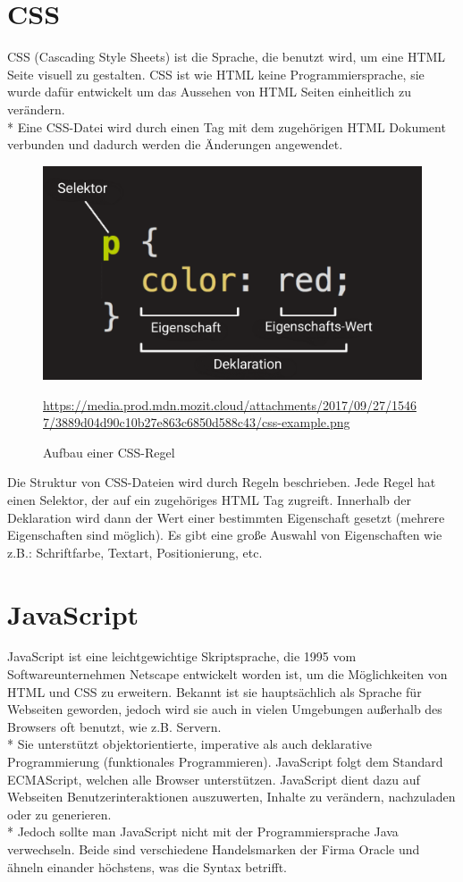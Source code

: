 \section{CSS}
\author{Benjamin Besic}
CSS (Cascading Style Sheets) ist die Sprache, die benutzt wird, um eine HTML Seite visuell zu gestalten. CSS ist wie HTML keine Programmiersprache, sie wurde dafür entwickelt um das Aussehen von HTML Seiten einheitlich zu verändern.\\*
Eine CSS-Datei wird durch einen Tag mit dem zugehörigen HTML Dokument verbunden und dadurch werden die Änderungen angewendet. \cite{CSSMozilla}

\begin{figure}[htp]
    \centering
    \includegraphics[scale=0.3]{pics/CSSRegel.png}
    \caption{Aufbau einer CSS-Regel}
        \small \url{https://media.prod.mdn.mozit.cloud/attachments/2017/09/27/15467/3889d04d90c10b27e863c6850d588c43/css-example.png}
    \label{fig:impl:CSSRule}
\end{figure}

Die Struktur von CSS-Dateien wird durch Regeln beschrieben. Jede Regel hat einen Selektor, der auf ein zugehöriges HTML Tag zugreift.
Innerhalb der Deklaration wird dann der Wert einer bestimmten Eigenschaft gesetzt (mehrere Eigenschaften sind möglich).
Es gibt eine große Auswahl von Eigenschaften wie z.B.: Schriftfarbe, Textart, Positionierung, etc. \cite{CSSMozilla}

\section{JavaScript}
\author{Benjamin Besic}
JavaScript ist eine leichtgewichtige Skriptsprache, die 1995 vom Softwareunternehmen Netscape entwickelt worden ist, um die Möglichkeiten von HTML und CSS zu erweitern.
Bekannt ist sie hauptsächlich als Sprache für Webseiten geworden, jedoch wird sie auch in vielen Umgebungen außerhalb des Browsers oft benutzt, wie z.B. Servern. 
\\* Sie unterstützt objektorientierte, imperative als auch deklarative Programmierung (funktionales Programmieren). JavaScript folgt dem Standard ECMAScript, welchen alle Browser unterstützen. 
JavaScript dient dazu auf Webseiten Benutzerinteraktionen auszuwerten, Inhalte zu verändern, nachzuladen oder zu generieren.  \\*
Jedoch sollte man JavaScript nicht mit der Programmiersprache Java verwechseln. Beide sind verschiedene Handelsmarken der Firma Oracle und ähneln einander höchstens, was die Syntax betrifft.
\cite{JSWiki} \cite{JSMozilla}
